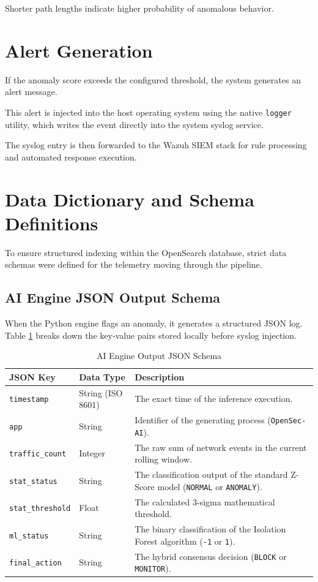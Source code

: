 \documentclass[12pt, a4paper]{report}
\begin{document}
	Shorter path lengths indicate higher probability of anomalous behavior.
	
	\section{Alert Generation}
	
	If the anomaly score exceeds the configured threshold, the system generates
	an alert message.
	
	This alert is injected into the host operating system using the native
	\texttt{logger} utility, which writes the event directly into the system
	syslog service.
	
	The syslog entry is then forwarded to the Wazuh SIEM stack for rule
	processing and automated response execution.
	
	\section{Data Dictionary and Schema Definitions}
	To ensure structured indexing within the OpenSearch database, strict data schemas were defined for the telemetry moving through the pipeline.
	
	
	
	\subsection{AI Engine JSON Output Schema}
	When the Python engine flags an anomaly, it generates a structured JSON log. Table \ref{tab:json_schema} breaks down the key-value pairs stored locally before syslog injection.
	
	\begin{table}[H]
		\centering
		\caption{AI Engine Output JSON Schema}
		\label{tab:json_schema}
		\vspace{0.2cm}
		\begin{tabularx}{\textwidth}{|l|l|X|}
			\hline
			\textbf{JSON Key} & \textbf{Data Type} & \textbf{Description} \\
			\hline
			\texttt{timestamp} & String (ISO 8601) & The exact time of the inference execution. \\
			\hline
			\texttt{app} & String & Identifier of the generating process (\texttt{OpenSec-AI}). \\
			\hline
			\texttt{traffic\_count} & Integer & The raw sum of network events in the current rolling window. \\
			\hline
			\texttt{stat\_status} & String & The classification output of the standard Z-Score model (\texttt{NORMAL} or \texttt{ANOMALY}). \\
			\hline
			\texttt{stat\_threshold} & Float & The calculated 3-sigma mathematical threshold. \\
			\hline
			\texttt{ml\_status} & String & The binary classification of the Isolation Forest algorithm (\texttt{-1} or \texttt{1}). \\
			\hline
			\texttt{final\_action} & String & The hybrid consensus decision (\texttt{BLOCK} or \texttt{MONITOR}). \\
			\hline
		\end{tabularx}
	\end{table}
	
\end{document}

